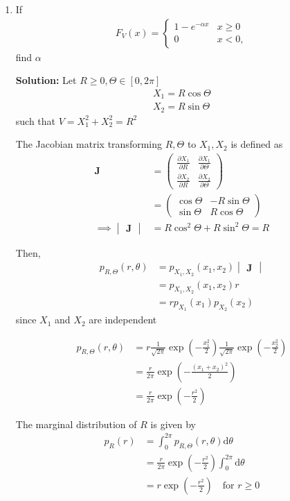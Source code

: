 \documentclass[journal,12pt,twocolumn]{IEEEtran}
\newcommand{\solution}{\noindent \textbf{Solution: }}
\providecommand{\brak}[1]{\ensuremath{\left(#1\right)}}
\providecommand{\der}[1]{\mathrm{d} #1}
\let\vec\mathbf
\numberwithin{equation}{section}
\renewcommand\thesection{\arabic{section}}
\newcommand{\myvec}[1]{\ensuremath{\begin{pmatrix}#1\end{pmatrix}}}
\newcommand{\mydet}[1]{\ensuremath{\begin{vmatrix}#1\end{vmatrix}}}
\begin{document}
\begin{enumerate}[label=\thesection.\arabic*,ref=\thesection.\theenumi]
	\item If
	\begin{align}
		F_{V}(x) = 
		\begin{cases}
			1 - e^{-\alpha x} & x \geq 0 \\
			0 & x < 0,
		\end{cases}	
	\end{align}
	find $\alpha$
	
	\solution Let $R \ge 0, \Theta \in [0, 2\pi]$
	\begin{align}
		X_1 = R\cos\Theta  \\
		X_2 = R\sin\Theta 
	\end{align}
	such that $V = X_1^2 + X_2^2 = R^2$
	 
	 The Jacobian matrix transforming $R, \Theta$ to $X_1, X_2$  is defined as 
	 \begin{align}
		\vec{J} &= \myvec{
			\frac{\partial X_1}{\partial R} & \frac{\partial X_1}{\partial \Theta} \\
			\frac{\partial X_2}{\partial R} & \frac{\partial X_2}{\partial \Theta}
		} \\
		&= \myvec{
			\cos\Theta & -R\sin\Theta \\
			\sin\Theta & R\cos\Theta
		} \\
		\implies \mydet{\vec{J}} &= R\cos^2\Theta + R\sin^2\Theta = R
	\end{align}
	
	Then,
	\begin{align}
		p_{R, \Theta} \brak{r, \theta} &= p_{X_1,X_2}\brak{x_1,x_2} \mydet{\vec{J}} \\
		&= p_{X_1,X_2}\brak{x_1,x_2} r \\
		&= r p_{X_1}(x_1) p_{X_2}(x_2)
	\end{align}
	since $X_1$ and $X_2$ are independent 
	
	\begin{align}
		p_{R, \Theta} \brak{r, \theta} &= r \frac{1}{\sqrt{2\pi}} \exp\brak{-\frac{x_1^2}{2}} \frac{1}{\sqrt{2\pi}} \exp\brak{-\frac{x_2^2}{2}} \\
		&= \frac{r}{2\pi} \exp\brak{-\frac{(x_1+x_2)^2}{2}} \\
		&= \frac{r}{2\pi} \exp\brak{-\frac{r^2}{2}} 
	\end{align}
	
	The marginal distribution of $R$ is given by
	\begin{align}
		p_R(r) &= \int_0^{2\pi} p_{R, \Theta} \brak{r, \theta} \der{\theta} \\
		&= \frac{r}{2\pi} \exp\brak{-\frac{r^2}{2}} \int_0^{2\pi}\der{\theta} \\
		&= r \exp\brak{-\frac{r^2}{2}} \quad \text{for } r \ge 0
	\end{align}		
	

\end{enumerate}
\end{document}
